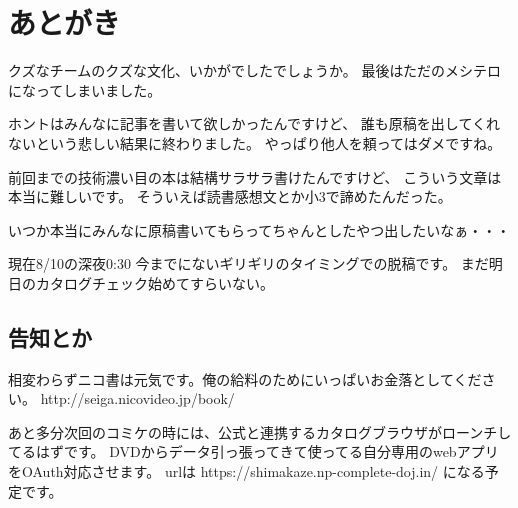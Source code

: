 \section{あとがき}

クズなチームのクズな文化、いかがでしたでしょうか。
最後はただのメシテロになってしまいました。

ホントはみんなに記事を書いて欲しかったんですけど、
誰も原稿を出してくれないという悲しい結果に終わりました。
やっぱり他人を頼ってはダメですね。

前回までの技術濃い目の本は結構サラサラ書けたんですけど、
こういう文章は本当に難しいです。
そういえば読書感想文とか小3で諦めたんだった。

いつか本当にみんなに原稿書いてもらってちゃんとしたやつ出したいなぁ・・・

現在8/10の深夜0:30 今までにないギリギリのタイミングでの脱稿です。
まだ明日のカタログチェック始めてすらいない。

\subsection{告知とか}

相変わらずニコ書は元気です。俺の給料のためにいっぱいお金落としてください。
http://seiga.nicovideo.jp/book/

あと多分次回のコミケの時には、公式と連携するカタログブラウザがローンチしてるはずです。
DVDからデータ引っ張ってきて使ってる自分専用のwebアプリをOAuth対応させます。
urlは https://shimakaze.np-complete-doj.in/ になる予定です。

